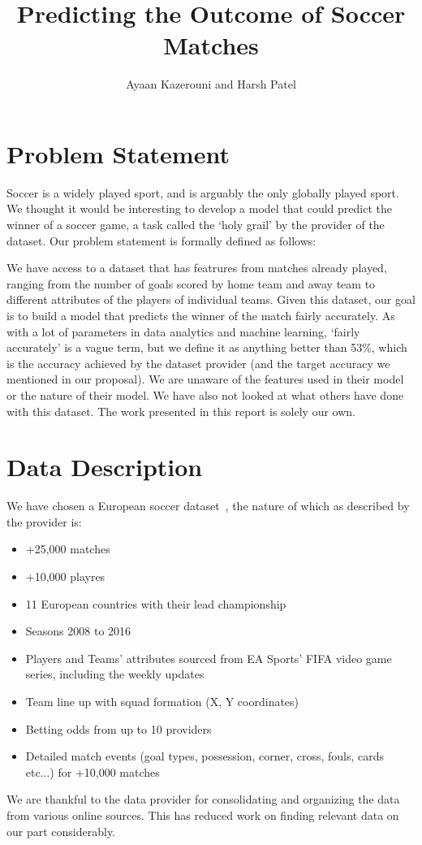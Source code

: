 \documentclass[11pt]{article}
\begin{document}
\title{Predicting the Outcome of Soccer Matches}
\author{Ayaan Kazerouni and Harsh Patel}
\date{}
\maketitle

\section{Problem Statement}
Soccer is a widely played sport, and is arguably the only globally played sport.
We thought it would be interesting to develop a model that could predict the winner of a soccer game, a task called the `holy grail' by the provider of the dataset. Our problem statement is formally defined as follows:

We have access to a dataset that has featrures from matches already played, ranging from the number of goals scored by home team and away team to different attributes of the players of individual teams. Given this dataset, our goal is to build a model that predicts the winner of the match fairly accurately.
As with a lot of parameters in data analytics and machine learning, `fairly accurately' is a vague term, but we define it as anything better than 53\%, which is the accuracy achieved by the dataset provider (and the target accuracy we mentioned in our proposal).
We are unaware of the features used in their model or the nature of their model. We have also not looked at what others have done with this dataset.
The work presented in this report is solely our own.

\section{Data Description}
\label{sec:data-desc}
We have chosen a European soccer dataset~\cite{mathien1}, the nature of which as described by the provider is:
\begin{itemize}
  \setlength\itemsep{0em}
  \item{+25,000 matches}
  \item{+10,000 playres}
  \item{11 European countries with their lead championship}
  \item{Seasons 2008 to 2016}
  \item{Players and Teams' attributes sourced from EA Sports' FIFA video game series, including the weekly updates}
  \item{Team line up with squad formation (X, Y coordinates)}
  \item{Betting odds from up to 10 providers}
  \item{Detailed match events (goal types, possession, corner, cross, fouls, cards etc...) for +10,000 matches}
\end{itemize}
We are thankful to the data provider for consolidating and organizing the data from various online sources.
This has reduced work on finding relevant data on our part considerably.
\end{document}

